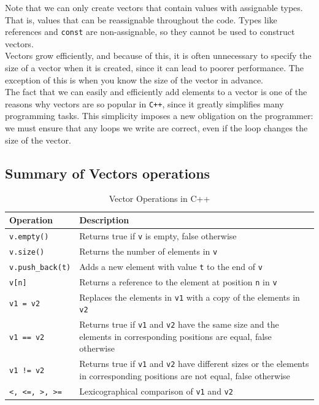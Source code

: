 Note that we can only create vectors that contain values with assignable types.
That is, values that can be reassignable throughout the code. Types like references
and \texttt{const} are non-assignable, so they cannot be used to construct vectors.\\

Vectors grow efficiently, and because of this, it is often unnecessary to specify the size of a vector when it is created,
since it can lead to poorer performance. The exception of this is when you know the size of the vector in advance.\\

The fact that we can easily and efficiently add elements to a vector is one of the reasons why vectors are so popular in
\texttt{C++}, since it greatly simplifies many programming tasks. This simplicity imposes a new obligation on the programmer:
we must ensure that any loops we write are correct, even if the loop changes the size of the vector.\\

\subsection{Summary of Vectors operations}

\begin{table}[ht]
\centering
\begin{tabular}{|l|p{7cm}|}
\hline
\textbf{Operation} & \textbf{Description} \\
\hline
\texttt{v.empty()} & Returns true if \texttt{v} is empty, false otherwise \\
\hline
\texttt{v.size()} & Returns the number of elements in \texttt{v} \\
\hline
\texttt{v.push\_back(t)} & Adds a new element with value \texttt{t} to the end of \texttt{v} \\
\hline
\texttt{v[n]} & Returns a reference to the element at position \texttt{n} in \texttt{v} \\
\hline
\texttt{v1 = v2} & Replaces the elements in \texttt{v1} with a copy of the elements in \texttt{v2} \\
\hline
\texttt{v1 == v2} & Returns true if \texttt{v1} and \texttt{v2} have the same size and the elements in corresponding positions are equal, false otherwise \\
\hline
\texttt{v1 != v2} & Returns true if \texttt{v1} and \texttt{v2} have different sizes or the elements in corresponding positions are not equal, false otherwise \\
\hline
\texttt{<, <=, >, >=} & Lexicographical comparison of \texttt{v1} and \texttt{v2} \\
\hline
\end{tabular}
\caption{Vector Operations in C++}
\label{tab:vector_operations}
\end{table}





